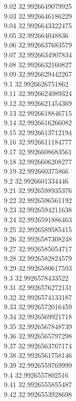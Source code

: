 {9.02	32.9926649079925\\
9.03	32.9926646186229\\
9.04	32.9926643322475\\
9.05	32.992664048836\\
9.06	32.9926637683579\\
9.07	32.9926634907834\\
9.08	32.9926632160827\\
9.09	32.9926629442267\\
9.1	32.9926626751862\\
9.11	32.9926624089324\\
9.12	32.9926621454369\\
9.13	32.9926618846715\\
9.14	32.9926616266082\\
9.15	32.9926613712194\\
9.16	32.9926611184777\\
9.17	32.9926608683561\\
9.18	32.9926606208277\\
9.19	32.992660375866\\
9.2	32.9926601334446\\
9.21	32.9926598935376\\
9.22	32.9926596561192\\
9.23	32.9926594211638\\
9.24	32.9926591886463\\
9.25	32.9926589585415\\
9.26	32.9926587308248\\
9.27	32.9926585054717\\
9.28	32.9926582824579\\
9.29	32.9926580617593\\
9.3	32.9926578433522\\
9.31	32.9926576272131\\
9.32	32.9926574133187\\
9.33	32.9926572016459\\
9.34	32.9926569921718\\
9.35	32.9926567848739\\
9.36	32.9926565797298\\
9.37	32.9926563767174\\
9.38	32.9926561758146\\
9.39	32.9926559769999\\
9.4	32.9926557802516\\
9.41	32.9926555855487\\
9.42	32.9926553928698\\
}
